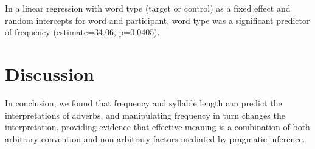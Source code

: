 \documentclass[10pt,letterpaper]{article}
\begin{document}
In a linear regression with word type (target or control) as a fixed effect and random intercepts for word and participant, word type was a significant predictor of frequency (estimate=34.06, p=0.0405).


% 


\section{Discussion}


In conclusion, we found that frequency and syllable length can predict the interpretations of adverbs, and manipulating frequency in turn changes the interpretation, providing evidence that effective meaning is a combination of both arbitrary convention and non-arbitrary factors mediated by pragmatic inference.
\end{document}
